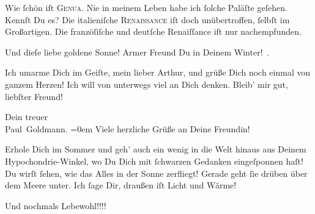 \pstart
           Wie ſchön iſt \textsc{Genua}. Nie in meinem Leben habe ich ſolche Paläſte geſehen. Kennſt Du es? Die italieniſche \textsc{Renaissance} iſt doch unübertroffen, ſelbſt im Großartigen. Die franzöſiſche und deutſche Renaiſſance iſt nur
               nachempfunden.\pend
           
\pstart
           Und dieſe liebe goldene Sonne! Armer Freund Du in Deinem Winter! .\textcolor{gray}{{\dotstwo}}\pend
           
\pstart
           Ich umarme Dich im Geiſte, mein lieber Arthur, und grüße Dich noch einmal von ganzem
                  {\pb}Herzen! Ich will von unterwegs viel an Dich
               denken. Bleib’ mir gut, liebſter Freund!\pend
           
\pstart
           Dein treuer {\\[\baselineskip]}\spacefill\mbox{Paul Goldmann.}\pend
           \leftskip=0em{}
\pstart
           \noindent{}Viele herzliche Grüße an Deine Freundin!\pend
           
\pstart
           Erhole Dich im Sommer und geh’ auch ein wenig in die Welt hinaus aus Deinem
                  Hypochondrie-Winkel, wo Du Dich mit ſchwarzen Gedanken eingeſponnen haſt! Du wirſt
                  ſehen, wie das Alles in der Sonne zerfliegt! Gerade geht ſie drüben über dem Meere
                  unter. Ich ſage Dir, draußen iſt Licht und Wärme!\pend
           
\pstart
           Und nochmals Lebewohl!!!!\pend
           \endnumbering{}  
      